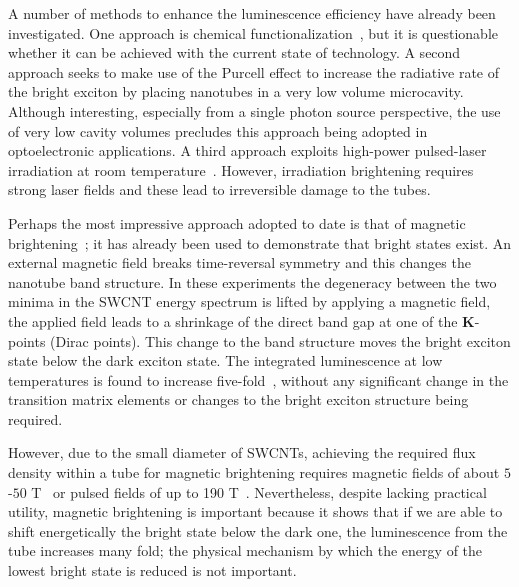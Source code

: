 \documentclass[journal=aamick,manuscript=article]{achemso}
\begin{document}
A number of methods to enhance the luminescence efficiency have already been investigated.
One approach is chemical functionalization~\cite{Kilina2012}, but it is questionable whether it can be achieved with the current state of technology.
A second approach seeks to make use of the Purcell effect to increase the radiative rate of the bright exciton by placing nanotubes in a very low volume microcavity\cite{Miura_NatComm_2014_5_5580,Luo_NatComm_2017_8_1413,Jeanet_NL_2017_17_4184}. Although interesting, especially from a single photon source perspective, the use of very low cavity volumes precludes this approach being adopted in optoelectronic applications.
A third approach exploits high-power pulsed-laser irradiation at room temperature~\cite{Harutyunyan2009}.
However, irradiation brightening requires strong laser fields and these lead to irreversible damage to the tubes. 

Perhaps the most impressive approach adopted to date is that of magnetic brightening~\cite{Shaver2007,Shaver2007a,Srivastava2008}; it has already been used to demonstrate that bright states exist.
An external magnetic field breaks time-reversal symmetry and this changes the nanotube band structure. 
In these experiments the degeneracy between the two minima in the SWCNT energy spectrum is lifted by applying a magnetic field, the applied field leads to a shrinkage of the direct band gap at one of the {\bf K}-points (Dirac points).
This change to the band structure moves the bright exciton state below the dark exciton state. The integrated luminescence at low temperatures is found to increase five-fold~\cite{Shaver2007}, without any significant change in the transition matrix elements or changes to the bright exciton structure being required.

However, due to the small diameter of SWCNTs, achieving the required flux density within a tube for magnetic brightening requires magnetic fields of about $5$-$50$ T~\cite{Shaver2007a,Srivastava2008} or pulsed fields of up to 190 T~\cite{Zhou2014}. 
Nevertheless, despite lacking practical utility, magnetic brightening is important because it shows that if we are able to shift energetically the bright state below the dark one, the luminescence from the tube increases many fold; the physical mechanism by which the energy of the lowest bright state is reduced is not important.  
\end{document}
